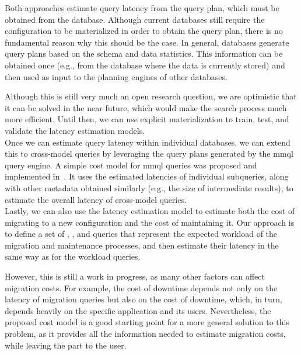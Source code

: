 Both approaches estimate query latency from the query plan, which must be obtained from the database. Although current databases still require the configuration to be materialized in order to obtain the query plan, there is no fundamental reason why this should be the case. In general, databases generate query plans based on the schema and data statistics. This information can be obtained once (e.g., from the database where the data is currently stored) and then used as input to the planning engines of other databases.

Although this is still very much an open research question, we are optimistic that it can be solved in the near future, which would make the search process much more efficient. Until then, we can use explicit materialization to train, test, and validate the latency estimation models.\\

Once we can estimate query latency within individual databases, we can extend this to cross-model queries by leveraging the query plans generated by the \acrshort{mmql} query engine. A simple cost model for \acrshort{mmql} queries was proposed and implemented in~\citep{strobl-mastersthesis}. It uses the estimated latencies of individual subqueries, along with other metadata obtained similarly (e.g., the size of intermediate results), to estimate the overall latency of cross-model queries.\\

Lastly, we can also use the latency estimation model to estimate both the cost of migrating to a new configuration and the cost of maintaining it. Our approach is to define a set of , , and  queries that represent the expected workload of the migration and maintenance processes, and then estimate their latency in the same way as for the workload queries.

However, this is still a work in progress, as many other factors can affect migration costs. For example, the cost of downtime depends not only on the latency of migration queries but also on the  cost of downtime, which, in turn, depends heavily on the specific application and its users. Nevertheless, the proposed cost model is a good starting point for a more general solution to this problem, as it provides all the  information needed to estimate migration costs, while leaving the  part to the user.

